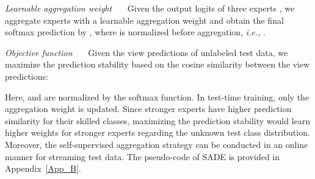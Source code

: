 \documentclass{article}
\def\ie{\emph{i.e.}} \def\Ie{\emph{I.e.}}
\def\ie{\emph{i.e., }}
\begin{document}
    
 \emph{Learnable aggregation weight}~~~ 
Given the output logits of three experts , we aggregate  experts with a  learnable aggregation weight    and obtain the final softmax prediction by , where  is normalized before aggregation, \ie . 
    
 
\emph{Objective function}~~~ Given the view predictions of unlabeled test data,  we maximize the prediction stability based on the cosine similarity between the view predictions: 
 
Here,  and  are normalized by the softmax function. In test-time training, only the aggregation weight  is updated.  Since stronger experts have higher  prediction similarity for their skilled classes, maximizing the prediction stability  would learn higher weights for stronger experts regarding the unknown test class distribution. Moreover, the self-supervised aggregation strategy can be conducted in an online manner  for streaming test data. The  pseudo-code of SADE is provided in Appendix~\ref{App_B}.
  
  
\end{document}

